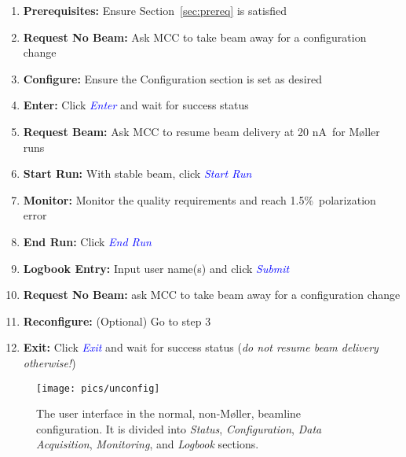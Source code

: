 \documentclass[amsmath,amssymb,notitlepage,12pt]{revtex4}
\newcommand{\ibeam}{20 nA\ }
\newcommand{\easy}{1.5\%}
\begin{document}
\begin{enumerate}
\vspace{-2mm}\item {\bf Prerequisites:}  Ensure Section~\ref{sec:prereq} is satisfied
\vspace{-4mm}\item {\bf Request No Beam:}  Ask MCC to take beam away for a configuration change
\vspace{-4mm}\item {\bf Configure:}  Ensure the Configuration section is set as desired
\vspace{-4mm}\item {\bf Enter:} Click \textcolor{blue}{\em Enter} and wait for success status
\vspace{-4mm}\item {\bf Request Beam:} Ask MCC to resume beam delivery at \ibeam for M{\o}ller runs
\vspace{-4mm}\item {\bf Start Run:} With stable beam, click \textcolor{blue}{\em Start Run}
\vspace{-4mm}\item {\bf Monitor:} Monitor the quality requirements and reach \easy\ polarization error
\vspace{-4mm}\item {\bf End Run:} Click \textcolor{blue}{\em End Run}
\vspace{-4mm}\item {\bf Logbook Entry:} Input user name(s) and click \textcolor{blue}{\em Submit}
\vspace{-4mm}\item {\bf Request No Beam:} ask MCC to take beam away for a configuration change
\vspace{-4mm}\item {\bf Reconfigure:} (Optional) Go to step 3
\vspace{-4mm}\item {\bf Exit:} Click \textcolor{blue}{\em Exit} and wait for success status ({\em do not resume beam delivery otherwise!})
\end{enumerate}

\begin{figure}[htbp]\centering
    \texttt{[image: pics/unconfig]}
    \caption{\label{fig:beamline}The user interface in the normal, non-M{\o}ller, beamline configuration.  It is divided into {\em Status}, {\em Configuration}, {\em Data Acquisition}, {\em Monitoring}, and {\em Logbook} sections.\label{fig:unconfig}}
\end{figure}
\end{document}

